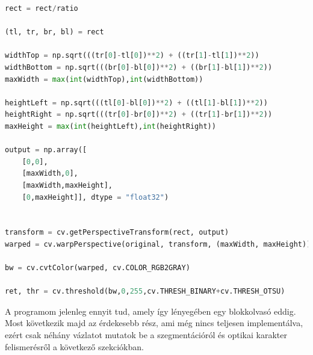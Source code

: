 \documentclass[a4paper,12pt]{article}
\begin{document}
\begin{lstlisting}[language=Python, caption= Befejező műveletek]
rect = rect/ratio

(tl, tr, br, bl) = rect

widthTop = np.sqrt(((tr[0]-tl[0])**2) + ((tr[1]-tl[1])**2))
widthBottom = np.sqrt(((br[0]-bl[0])**2) + ((br[1]-bl[1])**2))
maxWidth = max(int(widthTop),int(widthBottom))

heightLeft = np.sqrt(((tl[0]-bl[0])**2) + ((tl[1]-bl[1])**2))
heightRight = np.sqrt(((tr[0]-br[0])**2) + ((tr[1]-br[1])**2))
maxHeight = max(int(heightLeft),int(heightRight))

output = np.array([
    [0,0],
    [maxWidth,0],
    [maxWidth,maxHeight],
    [0,maxHeight]], dtype = "float32")


transform = cv.getPerspectiveTransform(rect, output)
warped = cv.warpPerspective(original, transform, (maxWidth, maxHeight))

bw = cv.cvtColor(warped, cv.COLOR_RGB2GRAY)

ret, thr = cv.threshold(bw,0,255,cv.THRESH_BINARY+cv.THRESH_OTSU)
\end{lstlisting}
A programom jelenleg ennyit tud, amely így lényegében egy blokkolvasó eddig. Most következik majd az érdekesebb rész, ami még nincs teljesen implementálva, ezért csak néhány vázlatot mutatok be a szegmentációról és optikai karakter felismerésről a következő szekciókban.
\newpage
\end{document}

